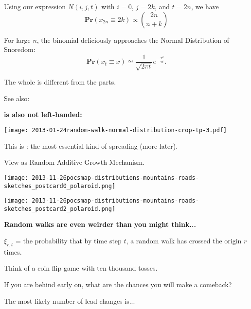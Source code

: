       Using our expression $N(i,j,t)$ with
      $i=0$, $j=2k$, and $t=2n$, we have
      $$
      \mathbf{Pr}(x_{2n} \equiv 2k) 
      \propto 
      \binom{2n}{n+k}
      $$
    
      For large $n$, the binomial
      deliciously approaches the Normal Distribution of Snoredom:
      $$
      \mathbf{Pr}(x_{t} \equiv x) 
      \simeq
      \frac{1}{\sqrt{2\pi t}}
      e^{-\frac{x^2}{2t}}.
      $$
     
      The whole is different from the parts. \hfill {}
     
      See also: 
    
  



  \textbf{ is also not left-handed:}

  
    \texttt{[image: 2013-01-24random-walk-normal-distribution-crop-tp-3.pdf]}
    
     
      This is : 
      the most essential kind of spreading (more later).
     
    View as Random Additive Growth Mechanism.
  
  


  \texttt{[image: 2013-11-26pocsmap-distributions-mountains-roads-sketches\_postcard0\_polaroid.png]}

  \texttt{[image: 2013-11-26pocsmap-distributions-mountains-roads-sketches\_postcard2\_polaroid.png]}



  \textbf{Random walks are even weirder than you might think...}
    
    
      $\xi_{r,t}$ = the probability that by time step $t$,
      a random walk has crossed the origin $r$ times.
    
      Think of a coin flip game with ten thousand tosses.
    
      If you are behind early on, what are the chances you
      will make a comeback?
    
      The most likely number of lead changes is...  
      {}
    
